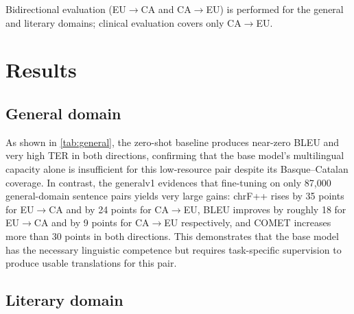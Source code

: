 \documentclass[11pt,a4paper]{article}
\begin{document}
Bidirectional evaluation (EU$\to$CA and CA$\to$EU) is performed for
the general and literary domains; clinical evaluation covers only
CA$\to$EU.

\section{Results}
\label{sec:results}

\subsection{General domain}

As shown in \autoref{tab:general}, the zero-shot baseline produces near-zero BLEU and very high TER in
both directions, confirming that the base model's multilingual
capacity alone is insufficient for this low-resource pair despite
its Basque--Catalan coverage. In contrast, the generalv1 evidences that fine-tuning on only 87,000 general-domain
sentence pairs yields very large gains: chrF++ rises by 35 points for EU$\to$CA and by 24 points for CA$\to$EU, BLEU improves by roughly 18 for EU$\to$CA and by 9 points
for CA$\to$EU respectively, and COMET increases more than 30 points in both directions. This demonstrates that the base model has the necessary linguistic
competence but requires task-specific supervision to produce usable
translations for this pair.

\begin{table}[H]
\small
\centering
{}
\caption{General domain results. Bold: best per direction.}
\label{tab:general}
\end{table}

\subsection{Literary domain}
\end{document}
